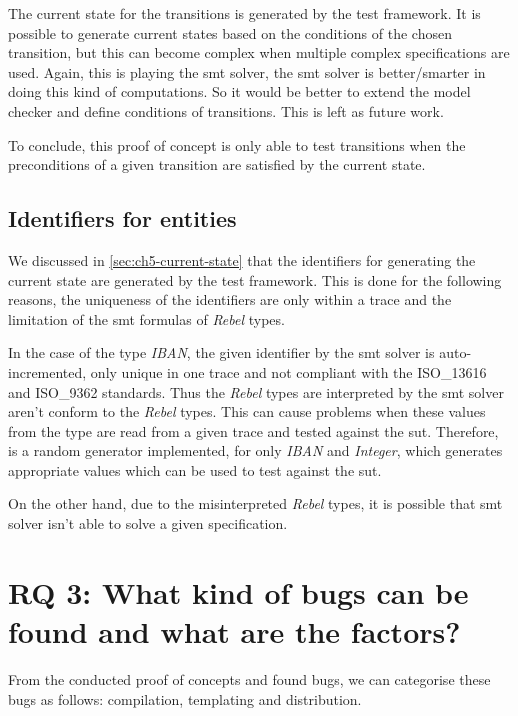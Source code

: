 The current state for the transitions is generated by the test framework. It is possible to generate current states based on the conditions of the chosen transition, but this can become complex when multiple complex specifications are used. Again, this is playing the \gls{smt} solver, the \gls{smt} solver is better/smarter in doing this kind of computations. So it would be better to extend the model checker and define conditions of transitions. This is left as future work.

To conclude, this proof of concept is only able to test transitions when the preconditions of a given transition are satisfied by the current state.


\subsection{Identifiers for entities}
We discussed in \autoref{sec:ch5-current-state} that the identifiers for generating the current state are generated by the test framework. This is done for the following reasons, the uniqueness of the identifiers are only within a trace and the limitation of the \gls{smt} formulas of \textit{Rebel} types.

In the case of the type \textit{IBAN}, the given identifier by the \gls{smt} solver is auto-incremented, only unique in one trace and not compliant with the ISO\_13616 and ISO\_9362 standards. Thus the \textit{Rebel} types are interpreted by the \gls{smt} solver aren't conform to the \textit{Rebel} types. This can cause problems when these values from the type are read from a given trace and tested against the \gls{sut}. Therefore, is a random generator implemented, for only \textit{IBAN} and \textit{Integer}, which generates appropriate values which can be used to test against the \gls{sut}.

On the other hand, due to the misinterpreted \textit{Rebel} types, it is possible that \gls{smt} solver isn't able to solve a given specification.


\section{RQ 3: What kind of bugs can be found and what are the factors?}

From the conducted proof of concepts and found bugs, we can categorise these bugs as follows: compilation, templating and distribution.

